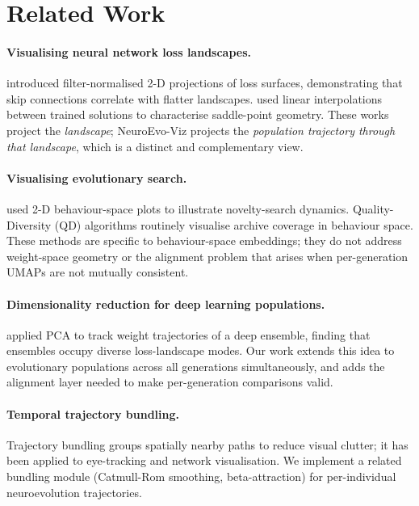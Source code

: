 \documentclass{article}
\begin{document}
\section{Related Work}
\label{sec:related}

\paragraph{Visualising neural network loss landscapes.}
\citet{li2018losslandscapes} introduced filter-normalised 2-D projections of
loss surfaces, demonstrating that skip connections correlate with flatter
landscapes.
\citet{goodfellow2015qualitative} used linear interpolations between trained
solutions to characterise saddle-point geometry.
These works project the \emph{landscape}; NeuroEvo-Viz projects the
\emph{population trajectory through that landscape}, which is a distinct and
complementary view.

\paragraph{Visualising evolutionary search.}
\citet{lehman2011novelty} used 2-D behaviour-space plots to illustrate
novelty-search dynamics.
Quality-Diversity (QD) algorithms
\citep{mouret2015illuminating,cully2015robots} routinely visualise archive
coverage in behaviour space.
These methods are specific to behaviour-space embeddings; they do not address
weight-space geometry or the alignment problem that arises when per-generation
UMAPs are not mutually consistent.

\paragraph{Dimensionality reduction for deep learning populations.}
\citet{fort2019deepens} applied PCA to track weight trajectories of a deep
ensemble, finding that ensembles occupy diverse loss-landscape modes.
Our work extends this idea to evolutionary populations across all generations
simultaneously, and adds the alignment layer needed to make per-generation
comparisons valid.

\paragraph{Temporal trajectory bundling.}
Trajectory bundling \citep{holten2009force} groups spatially nearby paths to
reduce visual clutter; it has been applied to eye-tracking and network
visualisation.
We implement a related bundling module (Catmull-Rom smoothing, beta-attraction)
for per-individual neuroevolution trajectories.
\end{document}
